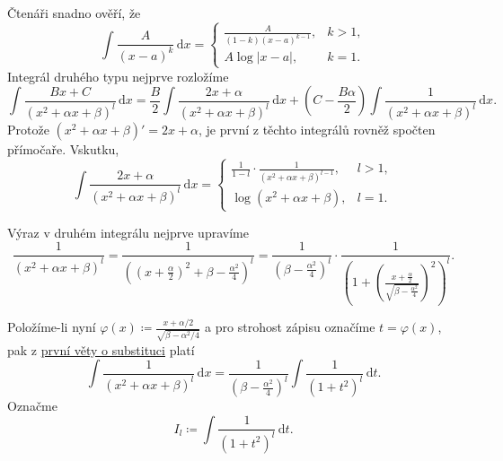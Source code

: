 Čtenáři snadno ověří, že
\[
 \int \frac{A}{(x - a)^{k}} \, \mathrm{d}x = \begin{cases}
  \frac{A}{(1 - k)(x - a)^{k-1}},& k > 1,\\
  A\log|x - a|, & k = 1.
 \end{cases}
\]
Integrál druhého typu nejprve rozložíme
\[
 \int \frac{Bx + C}{(x^2 + \alpha x + \beta)^{l}} \, \mathrm{d}x =
 \frac{B}{2}\int \frac{2x + \alpha}{(x^2 + \alpha x + \beta)^{l}} \, \mathrm{d}x
 + \left( C - \frac{B\alpha}{2} \right) \int \frac{1}{(x^2 + \alpha x +
 \beta)^{l}} \, \mathrm{d}x.
\]
Protože $(x^2 + \alpha x + \beta)' = 2x + \alpha$, je první z těchto integrálů
rovněž spočten přímočaře. Vskutku,
\[
 \int \frac{2x + \alpha}{(x^2 + \alpha x + \beta)^{l}} \, \mathrm{d}x = \begin{cases}
  \frac{1}{1 - l} \cdot \frac{1}{(x^2 + \alpha x + \beta)^{l-1}}, & l > 1,\\
  \log(x^2 + \alpha x + \beta), & l = 1.
 \end{cases}
\]

Výraz v druhém integrálu nejprve upravíme
\[
 \frac{1}{(x^2 + \alpha x + \beta)^{l}} = \frac{1}{\left( \left( x +
 \frac{\alpha}{2} \right)^2 + \beta - \frac{\alpha^2}{4} \right)^{l}} =
 \frac{1}{\left( \beta - \frac{\alpha^2}{4} \right)^{l}} \cdot \frac{1}{\left( 1
 + \left( \frac{x + \frac{\alpha}{2}}{\sqrt{\beta - \frac{\alpha^2}{4}}}
 \right)^2\right)^{l}}.
\]

Položíme-li nyní $\varphi(x) \coloneqq \frac{x + \alpha / 2}{\sqrt{\beta -
\alpha^2 / 4}}$ a pro strohost zápisu označíme $t = \varphi(x)$, pak z
\hyperref[thm:prvni-o-substituci]{první věty o substituci} platí
\[
 \int \frac{1}{(x^2 + \alpha x + \beta)^{l}} \, \mathrm{d}x = \frac{1}{\left(
 \beta - \frac{\alpha^2}{4} \right)^{l}} \int \frac{1}{(1+t^2)^{l}} \,
 \mathrm{d}t. 
\]
Označme
\[
 I_l \coloneqq \int \frac{1}{(1+t^2)^{l}} \, \mathrm{d}t.
\]

